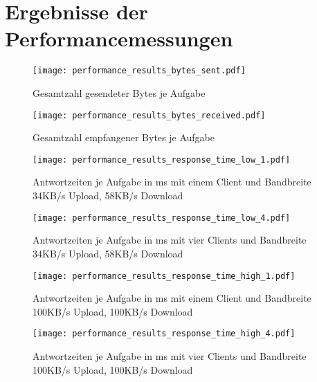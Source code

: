 \chapter{Ergebnisse der Performancemessungen}\label{ch:appendices|performance}

\begin{figure}[!ht]
    \centering
    \texttt{[image: performance\_results\_bytes\_sent.pdf]}
    \caption{Gesamtzahl gesendeter Bytes je Aufgabe}

    \texttt{[image: performance\_results\_bytes\_received.pdf]}
    \caption{Gesamtzahl empfangener Bytes je Aufgabe}
\end{figure}

\begin{figure}[!ht]
    \centering
    \texttt{[image: performance\_results\_response\_time\_low\_1.pdf]}
    \caption{Antwortzeiten je Aufgabe in ms mit einem Client und Bandbreite 34KB/s Upload, 58KB/s Download}
    
    \texttt{[image: performance\_results\_response\_time\_low\_4.pdf]}
    \caption{Antwortzeiten je Aufgabe in ms mit vier Clients und Bandbreite 34KB/s Upload, 58KB/s Download}
\end{figure}

\begin{figure}[!ht]
    \centering
    \texttt{[image: performance\_results\_response\_time\_high\_1.pdf]}
    \caption{Antwortzeiten je Aufgabe in ms mit einem Client und Bandbreite 100KB/s Upload, 100KB/s Download}

    \texttt{[image: performance\_results\_response\_time\_high\_4.pdf]}
    \caption{Antwortzeiten je Aufgabe in ms mit vier Clients und Bandbreite 100KB/s Upload, 100KB/s Download}
\end{figure}
